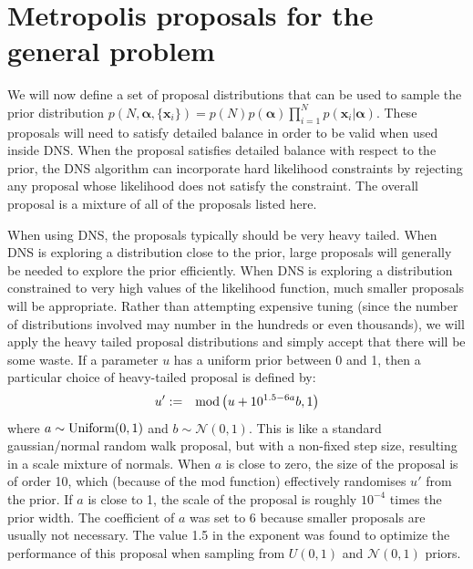 \documentclass[letterpaper, 11pt]{article}
\newcommand{\hyperparams}{\boldsymbol{\alpha}}
\newcommand{\xx}{\mathbf{x}}
\begin{document}


\section{Metropolis proposals for the general problem}\label{sec:proposals}
We will now define a set of proposal distributions that can be used to
sample the prior distribution
$p(N, \hyperparams, \{\xx_i\}) = p(N) p(\hyperparams) \prod_{i=1}^N p(\xx_i | \hyperparams)$.
These proposals will need to satisfy detailed balance in order to be valid
when used inside DNS. When the proposal satisfies detailed balance with respect
to the prior, the DNS algorithm can incorporate hard likelihood constraints by
rejecting any proposal whose likelihood does not satisfy the constraint.
The overall proposal is a mixture of all of the proposals listed here.

When using DNS,
the proposals typically should be very heavy tailed. When
DNS is exploring a distribution close to the prior, large proposals will
generally be needed to explore the prior efficiently.
When DNS is exploring a distribution constrained to
very high values of the likelihood function, much smaller proposals will be
appropriate. Rather than attempting expensive tuning (since the number of
distributions involved may number in the hundreds or even thousands), we will
apply the heavy tailed proposal distributions and simply accept that there will
be some waste. If a parameter $u$ has a uniform prior between 0 and 1, then
a particular choice of heavy-tailed proposal is defined by:
\begin{eqnarray}
u' &:=& \textnormal{mod}\left(u + 10^{1.5 - 6a}b, 1\right)\label{eqn:heavytailed}
\end{eqnarray}
where $a \sim \textnormal{Uniform}(0, 1)$ and $b\sim \mathcal{N}(0,1)$.
This is like a standard gaussian/normal random walk proposal, but with a
non-fixed step size, resulting in a scale mixture of normals.
When
$a$ is close to zero, the size of the proposal is of order 10, which (because
of the mod function) effectively randomises $u'$ from the prior. If $a$ is
close to 1, the scale of the proposal is roughly $10^{-4}$ times the prior
width. The coefficient of $a$ was set to 6 because smaller proposals are
usually not necessary. The value 1.5 in the exponent was found to optimize the
performance of this proposal when sampling from $U(0, 1)$ and $\mathcal{N}(0,1)$
priors.
\end{document}
